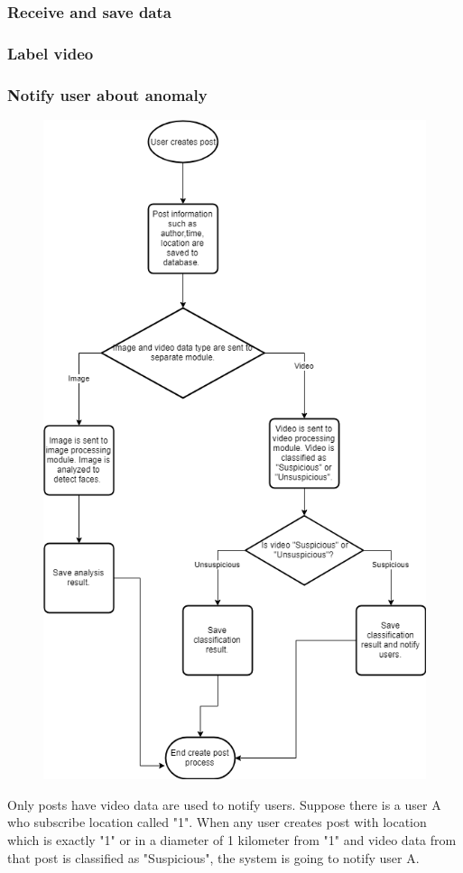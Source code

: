 \subsubsection{Receive and save data}
\subsubsection{Label video}
\cleardoublepage
\subsubsection{Notify user about anomaly}
\begin{center}
    \begin{figure}[H]
    \centering
    \includegraphics[width=0.7\columnwidth]{images/chap4/createpostflowchart.png}
    \end{figure}
\end{center}
Only posts have video data are used to notify users. Suppose there is a user A who subscribe location called "1". When any user creates post with location which is exactly "1" or in a diameter of 1 kilometer from "1" and video data from that post is classified as "Suspicious", the system is going to notify user A.

